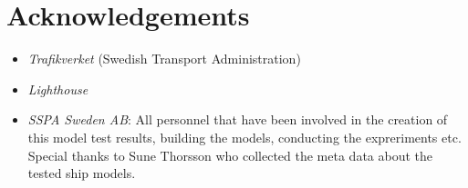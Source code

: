 \section*{Acknowledgements}
\label{se:acknowledgements}

\begin{itemize}
    \item \emph{Trafikverket} (Swedish Transport Administration)
    \item \emph{Lighthouse}
    \item \emph{SSPA Sweden AB}: All personnel that have been involved in the creation of this model test results, building the models, conducting the expreriments etc.  Special thanks to Sune Thorsson who collected the meta data about the tested ship models.
\end{itemize}




